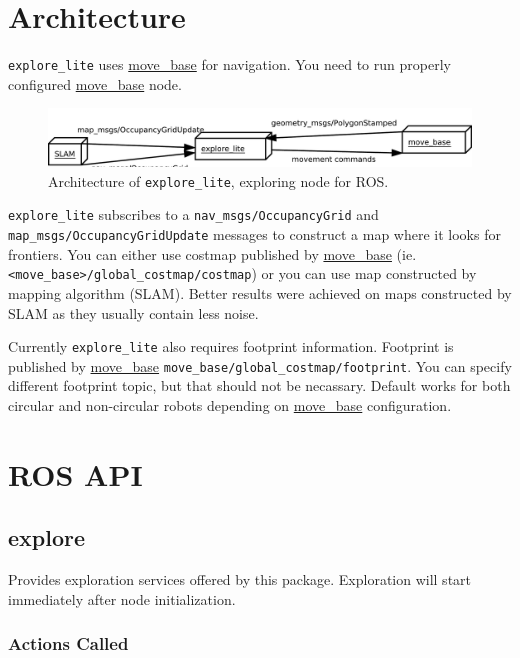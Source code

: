 \section{Architecture}

\texttt{explore\_lite} uses \href{http://wiki.ros.org/move_base}{move\_base} for navigation. You need to run properly configured \href{http://wiki.ros.org/move_base}{move\_base} node.

\begin{figure}
    \centering
    \includegraphics[width=\textwidth]{../img/explore_architecture.pdf}
    \caption{Architecture of \texttt{explore\_lite}, exploring node for \gls{ROS}.}
    \label{fig:explorearchitecture}
\end{figure}

\texttt{explore\_lite} subscribes to a \texttt{nav\_msgs/Occu\-pan\-cy\-Grid} and \texttt{map\_msgs/Occu\-pan\-cy\-Grid\-Up\-da\-te} messages to construct a map where it looks for frontiers. You can either use costmap published by \href{http://wiki.ros.org/move_base}{move\_base} (ie. \texttt{<mo\-ve\_ba\-se>/glo\-bal\_cost\-map/\-cost\-map}) or you can use map constructed by mapping algorithm (SLAM). Better results were achieved on maps constructed by SLAM as they usually contain less noise.

Currently \texttt{explore\_lite} also requires footprint information. Footprint is published by \href{http://wiki.ros.org/move_base}{move\_base} \texttt{move\_base/global\_costmap/footprint}. You can specify different footprint topic, but that should not be necassary. Default works for both circular and non-circular robots depending on \href{http://wiki.ros.org/move_base}{move\_base} configuration.

\section{ROS API}
\subsection{explore}

Provides exploration services offered by this package. Exploration will start immediately after node initialization.

\subsubsection{Actions Called}

